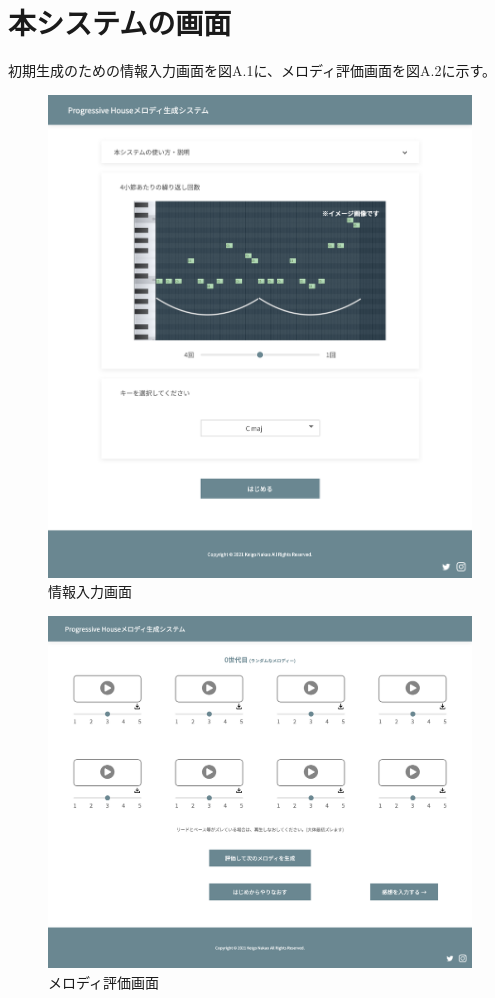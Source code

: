 \chapter{本システムの画面}
初期生成のための情報入力画面を図A.1に、メロディ評価画面を図A.2に示す。

\begin{figure}[htbp]
	\begin{center}
		\includegraphics[width=14.5cm]{image/mainDisplay.png}
		\caption{情報入力画面}
	\end{center}
\end{figure}

\begin{figure}[htbp]
	\begin{center}
		\includegraphics[scale=0.35]{image/subDisplay.png}
		\caption{メロディ評価画面}
	\end{center}
\end{figure}